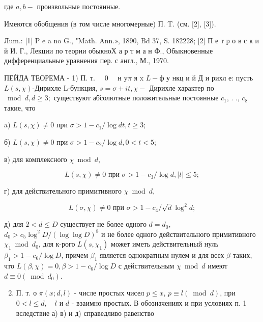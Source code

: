 \documentclass[10pt]{article}
\begin{document}
где $a, b-$ произвольные постоянные.



Имеются обобщения (в том числе многомерные) П. T. (см. [2], [3]).



Лum.: [1] P e a no G., "Math. Ann.», 1890, Bd 37, S. 182228; [2] П е т р о в с к и й И. Г., Лекции по теории обыкноХ а р т м а н Ф., Обыкновенные дифференциальные уравнения пер. с англ., М., 1970.



ПЕЙДА ТЕОРЕМА - 1) П. т. $\quad 0 \quad$ н $\mathrm{y} \pi$ я $\mathrm{x}$ $L-ф$ у нкц и й Д и рихл е: пусть $L(s, \chi)$-Дирихле L-бункция, $s=\sigma+i t, \chi-$ Дирихле характер по $\bmod d, d \geqslant 3 ;$ существуют аб̆солютные положительные постоянные $c_{1}$, . ., $c_{8}$ такие, что



a) $L(s, \chi) \neq 0$ при $\sigma>1-c_{1} / \log d t, t \geqslant 3$;



б) $L(s, \chi) \neq 0$ при $\sigma>1-c_{2} / \log d, 0<t<5$;



в) для комплексного $\chi \bmod d$,



\[

L(s, \chi) \neq 0 \text { при } \sigma>1-c_{3} / \log d,|t| \leqslant 5 ;

\]



г) для действительного примитивного $\chi \bmod d$,



\[

L(\sigma, \chi) \neq 0 \text { при } \sigma>1-c_{4} / \sqrt{d} \log ^{2} d ;

\]



д) для $2<d \leqslant D$ существует не более одного $d=d_{0}$, $d_{0}>c_{5} \log ^{2} D /(\log \log D)^{8}$ и не более одного действительного примитивного $\chi_{1} \bmod d_{0}$, для к-рого $L\left(s, \chi_{1}\right)$ может иметь действительный нуль $\beta_{1}>1-c_{6} / \log D$, причем $\beta_{1}$ является однократным нулем и для всех $\beta$ таких, что $L(\beta, \chi)=0, \beta>1-c_{6} / \log D$ с действительным $\chi \bmod d$ имеют $d \equiv 0\left(\bmod d_{0}\right)$.



\begin{enumerate}

  \setcounter{enumi}{1}

  \item П. т. о $\pi(x ; d, l)$ - числе простых чисел $p \leqslant x$, $p \equiv l(\bmod d)$, при $0<l \leqslant d, \quad l$ и $d$ - взаимно простых. В обозначениях и при условиях п. 1 вследствие а) в) и д) справедливо равенство

\end{enumerate}
\end{document}
